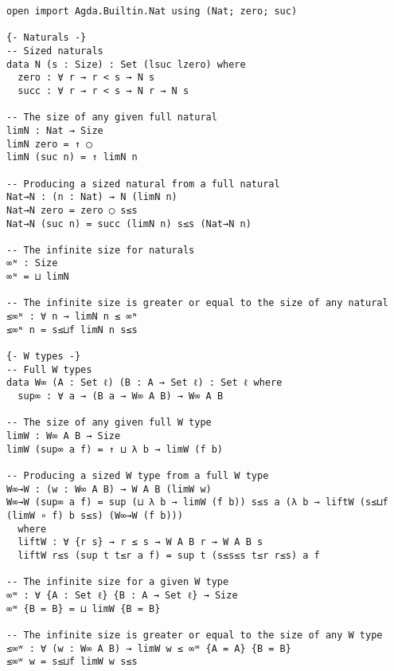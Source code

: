 \begin{singlespace}
\begin{verbatim}
open import Agda.Builtin.Nat using (Nat; zero; suc)

{- Naturals -}
-- Sized naturals
data N (s : Size) : Set (lsuc lzero) where
  zero : ∀ r → r < s → N s
  succ : ∀ r → r < s → N r → N s

-- The size of any given full natural
limN : Nat → Size
limN zero = ↑ ◯
limN (suc n) = ↑ limN n

-- Producing a sized natural from a full natural
Nat→N : (n : Nat) → N (limN n)
Nat→N zero = zero ◯ s≤s
Nat→N (suc n) = succ (limN n) s≤s (Nat→N n)

-- The infinite size for naturals
∞ᶰ : Size
∞ᶰ = ⊔ limN

-- The infinite size is greater or equal to the size of any natural
≤∞ᶰ : ∀ n → limN n ≤ ∞ᶰ
≤∞ᶰ n = s≤⊔f limN n s≤s

{- W types -}
-- Full W types
data W∞ (A : Set ℓ) (B : A → Set ℓ) : Set ℓ where
  sup∞ : ∀ a → (B a → W∞ A B) → W∞ A B

-- The size of any given full W type
limW : W∞ A B → Size
limW (sup∞ a f) = ↑ ⊔ λ b → limW (f b)

-- Producing a sized W type from a full W type
W∞→W : (w : W∞ A B) → W A B (limW w)
W∞→W (sup∞ a f) = sup (⊔ λ b → limW (f b)) s≤s a (λ b → liftW (s≤⊔f (limW ∘ f) b s≤s) (W∞→W (f b)))
  where
  liftW : ∀ {r s} → r ≤ s → W A B r → W A B s
  liftW r≤s (sup t t≤r a f) = sup t (s≤s≤s t≤r r≤s) a f

-- The infinite size for a given W type
∞ʷ : ∀ {A : Set ℓ} {B : A → Set ℓ} → Size
∞ʷ {B = B} = ⊔ limW {B = B}

-- The infinite size is greater or equal to the size of any W type
≤∞ʷ : ∀ (w : W∞ A B) → limW w ≤ ∞ʷ {A = A} {B = B}
≤∞ʷ w = s≤⊔f limW w s≤s
\end{verbatim}
\end{singlespace}